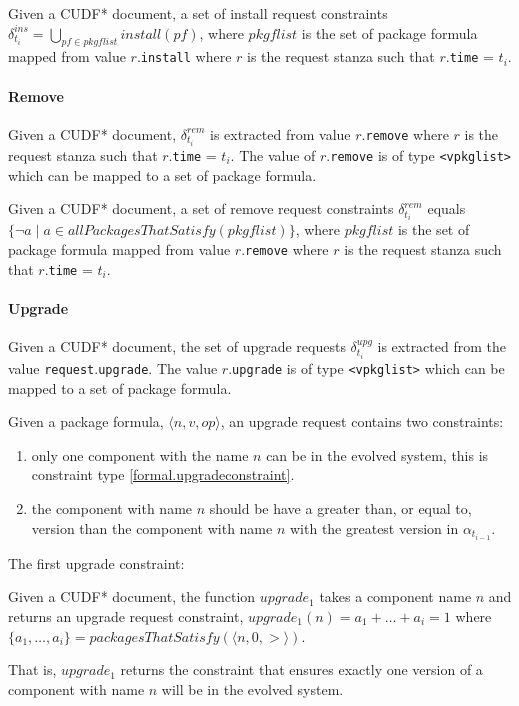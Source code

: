 \begin{defs}
Given a CUDF* document, a set of install request constraints $\delta_{t_i}^{ins} = \bigcup \limits_{pf \in pkgflist} install(pf)$, 
where $pkgflist$ is the set of package formula mapped from value $r$.\texttt{install} where $r$ is the request stanza such that $r$.\texttt{time} = $t_i$.
\end{defs}

\paragraph{Remove}
Given a CUDF* document, $\delta_{t_i}^{rem}$ is extracted from value $r$.\texttt{remove} where $r$ is the request stanza such that $r$.\texttt{time} = $t_i$.
The value of $r$.\texttt{remove} is of type \texttt{<vpkglist>} which can be mapped to a set of package formula.
\begin{defs}
Given a CUDF* document, a set of remove request constraints $\delta_{t_i}^{rem}$ equals $\{ \neg a \mid a \in allPackagesThatSatisfy(pkgflist)\}$, 
where $pkgflist$ is the set of package formula mapped from value $r$.\texttt{remove} where $r$ is the request stanza such that $r$.\texttt{time} = $t_i$.
\end{defs}

\paragraph{Upgrade}
Given a CUDF* document, the set of upgrade requests $\delta_{t_i}^{upg}$ is extracted from the value \texttt{request}.\texttt{upgrade}.
The value $r$.\texttt{upgrade} is of type \texttt{<vpkglist>} which can be mapped to a set of package formula.

Given a package formula, $\langle n, v, op \rangle$, an upgrade request contains two constraints:
\begin{enumerate}
  \item only one component with the name $n$ can be in the evolved system, this is constraint type \ref{formal.upgradeconstraint}.
  \item the component with name $n$ should be have a greater than, or equal to, version than the component with name $n$ with the greatest version in $\alpha_{t_{i-1}}$.
\end{enumerate}

The first upgrade constraint:
\begin{defs}
Given a CUDF* document, the function  $upgrade_1$ takes a component name $n$ and returns an upgrade request constraint, 
$upgrade_1(n) = a_1 + \ldots + a_i = 1$ where $\{a_1,\ldots,a_i\} = packagesThatSatisfy(\langle n,0,>\rangle)$. 
\end{defs}
That is, $upgrade_1$ returns the constraint that ensures exactly one version of a component with name $n$ will be in the evolved system.

